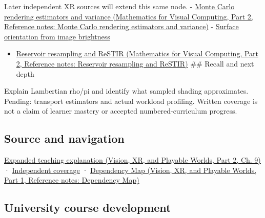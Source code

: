 Later independent XR sources will extend this same node. - \href{../02-Mathematics-for-Visual-Computing-P02/main.pdf\#nameddest=appendix-031e02bf28af}{Monte Carlo rendering estimators and variance (Mathematics for Visual Computing, Part 2, Reference notes: Monte Carlo rendering estimators and variance)} - \hyperref[appendix-89b2d5b7c9e1]{Surface orientation from image brightness}

\begin{itemize}
\tightlist
\item
  \href{../02-Mathematics-for-Visual-Computing-P02/main.pdf\#nameddest=appendix-68be451b78b1}{Reservoir resampling and ReSTIR (Mathematics for Visual Computing, Part 2, Reference notes: Reservoir resampling and ReSTIR)} \#\# Recall and next depth
\end{itemize}

Explain Lambertian rho/pi and identify what sampled shading approximates. Pending: transport estimators and actual workload profiling. Written coverage is not a claim of learner mastery or accepted numbered-curriculum progress.

\subsection{Source and navigation}\label{appendix-96da0b153b77-source-and-navigation}

\hypertarget{appendix-96da0b153b77-source-and-navigation}{}

\href{../07-Vision-XR-and-Playable-Worlds-P02/main.pdf\#nameddest=04-visual-computing-ii-ch042-materials-turn-incoming-light-into-outgoing-light}{Expanded teaching explanation (Vision, XR, and Playable Worlds, Part 2, Ch. 9)} · \hyperref[appendix-fd090d982a15-xr01---independent-seeing-and-representation-source]{Independent coverage} · \href{../07-Vision-XR-and-Playable-Worlds-P01/main.pdf\#nameddest=appendix-4ad47bdd269a}{Dependency Map (Vision, XR, and Playable Worlds, Part 1, Reference notes: Dependency Map)}

\subsection{University course development}\label{appendix-96da0b153b77-university-course-development}

\hypertarget{appendix-96da0b153b77-university-course-development}{}


